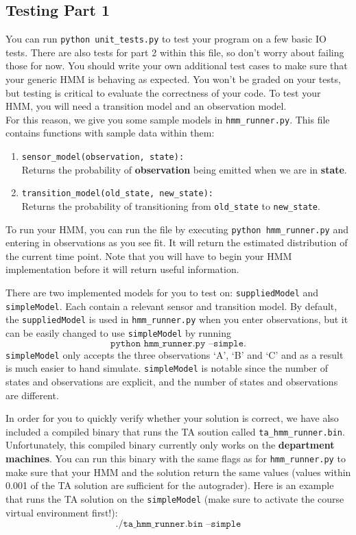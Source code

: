 \documentclass{article}
\begin{document}
\subsection{Testing Part 1}
\label{subsec:testingpart1}
You can run \texttt{python unit\_tests.py} to test your program on a few basic IO tests. There are also tests for part 2 within this file, so don't worry about failing those for now. You should write your own additional test cases to make sure that your generic HMM is behaving as expected. You won't be graded on your tests, but testing is critical to evaluate the correctness of your code. To test your HMM, you will need a transition model and an observation model.\\
For this reason, we give you some sample models in \texttt{hmm\_runner.py}. This file contains functions with sample data within them:
\begin{enumerate}
    \item \texttt{sensor\_model(observation, state):} \\
    Returns the probability of \textbf{observation} being emitted when we are in \textbf{state}.
    \item \texttt{transition\_model(old\_state, new\_state):} \\
    Returns the probability of transitioning from \texttt{old\_state} to \texttt{new\_state}.
\end{enumerate}
To run your HMM, you can run the file by executing \texttt{python hmm\_runner.py} and entering in observations as you see fit. It will return the estimated distribution of the current time point. Note that you will have to begin your HMM implementation before it will return useful information.

There are two implemented models for you to test on: \texttt{suppliedModel} and \texttt{simpleModel}. Each contain a relevant sensor and transition model. By default, the \texttt{suppliedModel} is used in \texttt{hmm\_runner.py} when you enter observations, but it can be easily changed to use \texttt{simpleModel} by running
\[\texttt{python hmm\_runner.py --simple}.\]
\texttt{simpleModel} only accepts the three observations `A', `B' and `C' and as a result is much easier to hand simulate. \texttt{simpleModel} is notable since the number of states and observations are explicit, and the number of states and observations are different.

In order for you to quickly verify whether your solution is correct, we have also included a compiled binary that runs the TA soution called \texttt{ta\_hmm\_runner.bin}. Unfortunately, this compiled binary currently only works on the \textbf{department machines}. You can run this binary with the same flags as for \texttt{hmm\_runner.py} to make sure that your HMM and the solution return the same values (values within 0.001 of the TA solution are sufficient for the autograder). Here is an example that runs the TA solution on the \texttt{simpleModel} (make sure to activate the course virtual environment first!):
\[\texttt{./ta\_hmm\_runner.bin --simple}\]
\end{document}
